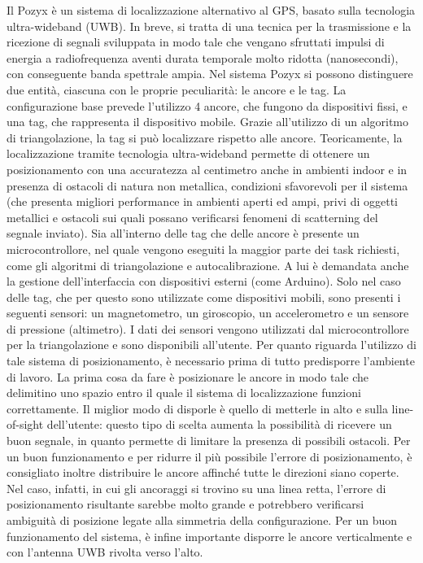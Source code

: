 Il Pozyx è un sistema di localizzazione alternativo al GPS, basato sulla tecnologia ultra-wideband
(UWB). In breve, si tratta di una tecnica per la trasmissione e la ricezione di segnali sviluppata in modo tale che vengano sfruttati impulsi di energia 
a radiofrequenza aventi durata temporale molto ridotta (nanosecondi), con conseguente banda spettrale ampia.
Nel sistema Pozyx si possono distinguere due entità, ciascuna con le proprie peculiarità: le ancore e le tag.
La configurazione base prevede l'utilizzo 4 ancore, che fungono da dispositivi fissi, e una tag, che rappresenta il dispositivo mobile.
Grazie all'utilizzo di un algoritmo di triangolazione, la tag si può localizzare rispetto alle ancore. Teoricamente, la localizzazione tramite tecnologia 
ultra-wideband permette di ottenere un posizionamento con una accuratezza al centimetro anche
in ambienti indoor e in presenza di ostacoli di natura non metallica, condizioni sfavorevoli per il sistema (che presenta 
migliori performance in ambienti aperti ed ampi, privi di oggetti metallici e ostacoli sui quali possano verificarsi fenomeni di scatterning 
del segnale inviato). 
Sia all'interno delle tag che delle ancore è presente un microcontrollore, nel quale vengono eseguiti la maggior parte dei task richiesti,
come gli algoritmi di triangolazione e autocalibrazione. A lui è demandata anche la gestione dell’interfaccia con dispositivi esterni
(come Arduino).
Solo nel caso delle tag, che per questo sono utilizzate come dispositivi mobili, sono presenti i seguenti sensori: un magnetometro, un giroscopio, un
accelerometro e un sensore di pressione (altimetro). I dati dei sensori vengono utilizzati dal microcontrollore
per la triangolazione e sono disponibili all’utente.
Per quanto riguarda l'utilizzo di tale sistema di posizionamento, è necessario prima di tutto predisporre l'ambiente di lavoro.
La prima cosa da fare è posizionare le ancore in modo tale che delimitino uno spazio entro il quale il sistema di localizzazione
funzioni correttamente. Il miglior modo di disporle è quello di metterle in alto e sulla line-of-sight dell’utente: questo tipo di scelta
aumenta la possibilità di ricevere un buon segnale, in quanto permette di limitare la presenza di possibili ostacoli. 
Per un buon funzionamento e per ridurre il più possibile l'errore di posizionamento, è consigliato inoltre distribuire le ancore affinché tutte le 
direzioni siano coperte.
Nel caso, infatti, in cui gli ancoraggi si trovino su una linea retta, l'errore di posizionamento risultante sarebbe molto grande e potrebbero
verificarsi ambiguità di posizione legate alla simmetria della configurazione.
Per un buon funzionamento del sistema, è infine importante disporre le ancore verticalmente e con l’antenna UWB rivolta verso l’alto.

